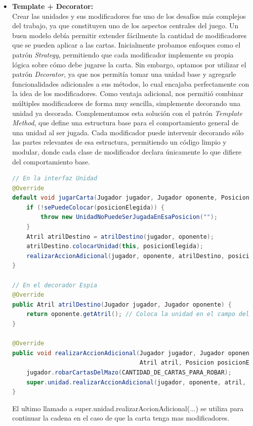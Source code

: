 \documentclass[titlepage,a4paper]{article}
\begin{document}
\begin{itemize}
		\item \textbf{Template + Decorator:} \\
		Crear las unidades y sus modificadores fue uno de los desafíos más complejos del trabajo, ya que constituyen uno de los aspectos centrales del juego. Un buen modelo debía permitir extender fácilmente la cantidad de modificadores que se pueden aplicar a las cartas.
		Inicialmente probamos enfoques como el patrón \textit{Strategy}, permitiendo que cada modificador implemente su propia lógica sobre cómo debe jugarse la carta. Sin embargo, optamos por utilizar el patrón \textit{Decorator}, ya que nos permitía tomar una unidad base y agregarle funcionalidades adicionales a sus métodos, lo cual encajaba perfectamente con la idea de los modificadores. Como ventaja adicional, nos permitió combinar múltiples modificadores de forma muy sencilla, simplemente decorando una unidad ya decorada.
		Complementamos esta solución con el patrón \textit{Template Method}, que define una estructura base para el comportamiento general de una unidad al ser jugada. Cada modificador puede intervenir decorando sólo las partes relevantes de esa estructura, permitiendo un código limpio y modular, donde cada clase de modificador declara únicamente lo que difiere del comportamiento base.


		\begin{lstlisting}[language=Java, caption={Ejemplo de patrón Template + Decorator en una carta con modificador Espia}]
// En la interfaz Unidad
@Override
default void jugarCarta(Jugador jugador, Jugador oponente, Posicion posicionElegida) {
    if (!sePuedeColocar(posicionElegida)) {
        throw new UnidadNoPuedeSerJugadaEnEsaPosicion("");
    }
    Atril atrilDestino = atrilDestino(jugador, oponente);
    atrilDestino.colocarUnidad(this, posicionElegida);
    realizarAccionAdicional(jugador, oponente, atrilDestino, posicionElegida);
}

// En el decorador Espia
@Override
public Atril atrilDestino(Jugador jugador, Jugador oponente) {
    return oponente.getAtril(); // Coloca la unidad en el campo del oponente
}

@Override
public void realizarAccionAdicional(Jugador jugador, Jugador oponente,
                                    Atril atril, Posicion posicionElegida) {
    jugador.robarCartasDelMazo(CANTIDAD_DE_CARTAS_PARA_ROBAR);
    super.unidad.realizarAccionAdicional(jugador, oponente, atril, posicionElegida);
}
		\end{lstlisting}
El ultimo llamado a super.unidad.realizarAccionAdicional(...) se utiliza para continuar la cadena en el caso de que la carta tenga mas modificadores.


\end{itemize}
\end{document}
